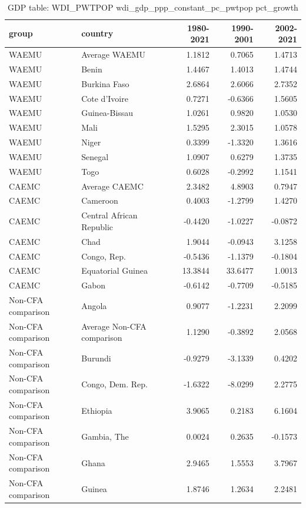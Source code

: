 \begin{table}

\caption{GDP table: WDI_PWTPOP wdi_gdp_ppp_constant_pc_pwtpop pct_growth}
\centering
\begin{tabular}[t]{llrrr}
\toprule
group & country & 1980-2021 & 1990-2001 & 2002-2021\\
\midrule
WAEMU & Average WAEMU & 1.1812 & 0.7065 & 1.4713\\
WAEMU & Benin & 1.4467 & 1.4013 & 1.4744\\
WAEMU & Burkina Faso & 2.6864 & 2.6066 & 2.7352\\
WAEMU & Cote d'Ivoire & 0.7271 & -0.6366 & 1.5605\\
WAEMU & Guinea-Bissau & 1.0261 & 0.9820 & 1.0530\\
\addlinespace
WAEMU & Mali & 1.5295 & 2.3015 & 1.0578\\
WAEMU & Niger & 0.3399 & -1.3320 & 1.3616\\
WAEMU & Senegal & 1.0907 & 0.6279 & 1.3735\\
WAEMU & Togo & 0.6028 & -0.2992 & 1.1541\\
CAEMC & Average CAEMC & 2.3482 & 4.8903 & 0.7947\\
\addlinespace
CAEMC & Cameroon & 0.4003 & -1.2799 & 1.4270\\
CAEMC & Central African Republic & -0.4420 & -1.0227 & -0.0872\\
CAEMC & Chad & 1.9044 & -0.0943 & 3.1258\\
CAEMC & Congo, Rep. & -0.5436 & -1.1379 & -0.1804\\
CAEMC & Equatorial Guinea & 13.3844 & 33.6477 & 1.0013\\
\addlinespace
CAEMC & Gabon & -0.6142 & -0.7709 & -0.5185\\
Non-CFA comparison & Angola & 0.9077 & -1.2231 & 2.2099\\
Non-CFA comparison & Average Non-CFA comparison & 1.1290 & -0.3892 & 2.0568\\
Non-CFA comparison & Burundi & -0.9279 & -3.1339 & 0.4202\\
Non-CFA comparison & Congo, Dem. Rep. & -1.6322 & -8.0299 & 2.2775\\
\addlinespace
Non-CFA comparison & Ethiopia & 3.9065 & 0.2183 & 6.1604\\
Non-CFA comparison & Gambia, The & 0.0024 & 0.2635 & -0.1573\\
Non-CFA comparison & Ghana & 2.9465 & 1.5553 & 3.7967\\
Non-CFA comparison & Guinea & 1.8746 & 1.2634 & 2.2481\\

\end{tabular}
\end{table}
